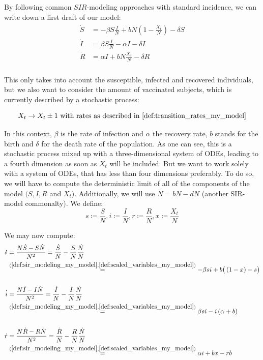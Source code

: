 \documentclass[12pt,a4paper,twoside]{article}
\begin{document}
By following common $SIR$-modeling approaches with standard incidence, we can write down a first draft of our model:
\begin{align}\label{def:sir_modeling_my_model}
\begin{split}
\dot{S} &= -\beta S\frac{I}{N} + bN\left(1-\frac{X_t}{N}\right) - \delta S\\
\dot{I} &= \beta S\frac{I}{N}  - \alpha I - \delta I\\
\dot{R} &= \alpha I + bN\frac{X_t}{N} - \delta R\\
\end{split}
\end{align}

This only takes into account the susceptible, infected and recovered individuals, but we also want to consider the amount of vaccinated subjects, which is currently described by a stochastic process:

\begin{equation*}
	X_t \rightarrow X_t \pm 1\textnormal{ with rates as described in \eqref{def:transition_rates_my_model}}
\end{equation*}

In this context, $\beta$ is the rate of infection and $\alpha$ the recovery rate, $b$ stands for the birth and $\delta$ for the death rate of the population. As one can see, this is a stochastic process mixed up with a three-dimensional system of \acp{ODE}, leading to a fourth dimension as soon as $X_t$ will be included. But we want to work solely with a system of \acp{ODE}, that has less than four dimensions preferably. To do so, we will have to compute the deterministic limit of all of the components of the model $(S,I, R$ and $X_t)$. Additionally, we will use $\dot{N} = bN - dN$ (another SIR-model commonalty). We define:
\begin{equation}\label{def:scaled_variables_my_model}
s\coloneqq \frac{S}{N}, i\coloneqq \frac{I}{N}, r\coloneqq \frac{R}{N}, x\coloneqq \frac{X_t}{N}
\end{equation}

We may now compute:
\begin{align*}
\dot{s} &= \frac{N\dot{S}-S\dot{N}}{N^2} = \frac{\dot{S}}{N} - \frac{S}{N}\frac{\dot{N}}{N}\\
&\overset{(\ref{def:sir_modeling_my_model}, \ref{def:scaled_variables_my_model})}{=} -\beta si + b\big(\left(1-x\right) - s\big)\\
&\\
\dot{i} &= \frac{N\dot{I}-I\dot{N}}{N^2} = \frac{\dot{I}}{N} - \frac{I}{N}\frac{\dot{N}}{N}\\
&\overset{(\ref{def:sir_modeling_my_model}, \ref{def:scaled_variables_my_model})}{=} \beta si - i\left(\alpha + b\right)\\
&\\
\dot{r} &= \frac{N\dot{R}-R\dot{N}}{N^2} = \frac{\dot{R}}{N} - \frac{R}{N}\frac{\dot{N}}{N}\\
&\overset{(\ref{def:sir_modeling_my_model}, \ref{def:scaled_variables_my_model})}{=} \alpha i + bx - rb
\end{align*}
\end{document}
